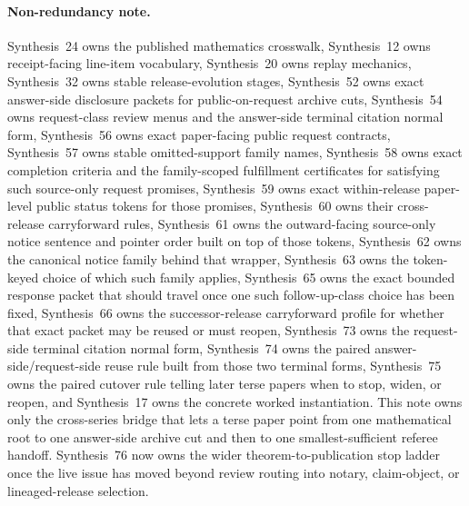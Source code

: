 \documentclass[11pt]{article}
\begin{document}
\paragraph{Non-redundancy note.}
Synthesis~24 owns the published mathematics crosswalk, Synthesis~12 owns receipt-facing line-item vocabulary, Synthesis~20 owns replay mechanics, Synthesis~32 owns stable release-evolution stages, Synthesis~52 owns exact answer-side disclosure packets for public-on-request archive cuts, Synthesis~54 owns request-class review menus and the answer-side terminal citation normal form, Synthesis~56 owns exact paper-facing public request contracts, Synthesis~57 owns stable omitted-support family names, Synthesis~58 owns exact completion criteria and the family-scoped fulfillment certificates for satisfying such source-only request promises, Synthesis~59 owns exact within-release paper-level public status tokens for those promises, Synthesis~60 owns their cross-release carryforward rules, Synthesis~61 owns the outward-facing source-only notice sentence and pointer order built on top of those tokens, Synthesis~62 owns the canonical notice family behind that wrapper, Synthesis~63 owns the token-keyed choice of which such family applies, Synthesis~65 owns the exact bounded response packet that should travel once one such follow-up-class choice has been fixed, Synthesis~66 owns the successor-release carryforward profile for whether that exact packet may be reused or must reopen, Synthesis~73 owns the request-side terminal citation normal form, Synthesis~74 owns the paired answer-side/request-side reuse rule built from those two terminal forms, Synthesis~75 owns the paired cutover rule telling later terse papers when to stop, widen, or reopen, and Synthesis~17 owns the concrete worked instantiation.\cite{series:mathcrosswalk,series:receiptitems,series:auditorreplay,series:releasespine,series:answerdisclosurepackets,series:challengeanswerreviewmenus,series:publicrequestcontracts,series:requestableevidenceclasses,series:requestfulfillmentcertificates,series:publicrequeststatusenvelopes,series:publicrequestcarryforward,series:publicrequestnotices,series:publicrequestnoticenormalforms,series:publicrequestnoticeselections,series:publicrequestresponsepackets,series:publicrequestresponsepacketcarryforward,series:publicrequestresponsepacketrefreshresponsepacketclosureverdicts,series:pairedterminalcitationdiscipline,series:pairedterminalcutoverrules,series:workedexample}
This note owns only the cross-series bridge that lets a terse paper point from one mathematical root to one answer-side archive cut and then to one smallest-sufficient referee handoff. Synthesis~76 now owns the wider theorem-to-publication stop ladder once the live issue has moved beyond review routing into notary, claim-object, or lineaged-release selection.\cite{series:theoremtopublicationspine}
\end{document}
